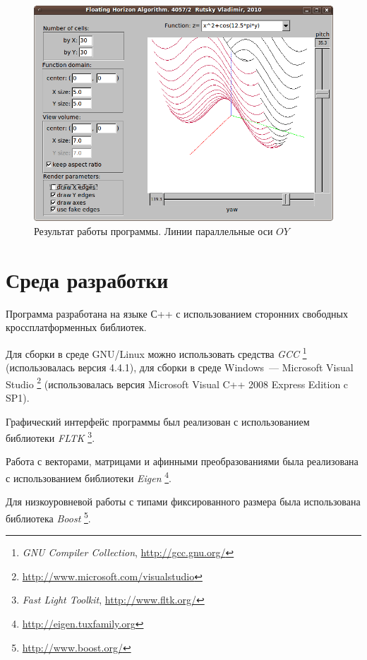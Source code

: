 \documentclass[a4paper,10pt]{article}
\begin{document}
\begin{figure}[h!]
  \centering
  \includegraphics[width=0.8\linewidth]{./screenshots/result1_vert.png}
  \caption{Результат работы программы. Линии параллельные оси $OY$}
  \label{fig:result1-vert}
\end{figure}

\section{Среда разработки}
Программа разработана на языке С++ с использованием сторонних свободных кроссплатформенных библиотек.

Для сборки в среде GNU/Linux можно использовать средства \textit{GCC}%
\footnote{\textit{GNU Compiler Collection}, \url{http://gcc.gnu.org/}} 
(использовалась версия 4.4.1),
для сборки в среде Windows~--- Microsoft Visual Studio%
\footnote{\url{http://www.microsoft.com/visualstudio}}
(использовалась версия Microsoft Visual C++ 2008 Express Edition c SP1).

Графический интерфейс программы был реализован с использованием библиотеки \textit{FLTK}%
\footnote{\textit{Fast Light Toolkit}, \url{http://www.fltk.org/}}.

Работа с векторами, матрицами и афинными преобразованиями была реализована с использованием библиотеки \textit{Eigen}%
\footnote{\url{http://eigen.tuxfamily.org}}.

Для низкоуровневой работы с типами фиксированного размера была использована библиотека \textit{Boost}%
\footnote{\url{http://www.boost.org/}}.


%

\end{document}
